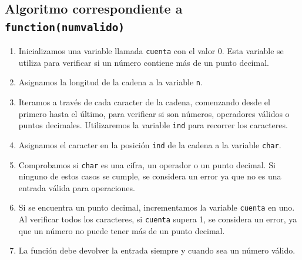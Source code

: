 \documentclass{article}
\begin{document}
\subsection{Algoritmo correspondiente a \texttt{function(num\textunderscore valido)}}
\begin{enumerate}
    \item Inicializamos una variable llamada \texttt{cuenta} con el valor 0. Esta variable se utiliza para verificar si un número contiene más de un punto decimal. 

    \item Asignamos la longitud de la cadena a la variable \texttt{n}.

    \item Iteramos a través de cada caracter de la cadena, comenzando desde el primero hasta el último, para verificar si son números, operadores válidos o puntos decimales. Utilizaremos la variable \texttt{ind} para recorrer los caracteres. 

    \item Asignamos el caracter en la posición \texttt{ind} de la cadena a la variable \texttt{char}.

    \item Comprobamos si \texttt{char} es una cifra, un operador o un punto decimal. Si ninguno de estos casos se cumple, se considera un error ya que no es una entrada válida para operaciones. 

    \item Si se encuentra un punto decimal, incrementamos la variable \texttt{cuenta} en uno. Al verificar todos los caracteres, si \texttt{cuenta} supera 1, se considera un error, ya que un número no puede tener más de un punto decimal. 

    \item La función debe devolver la entrada siempre y cuando sea un número válido.\\
\end{enumerate}
\end{document}
